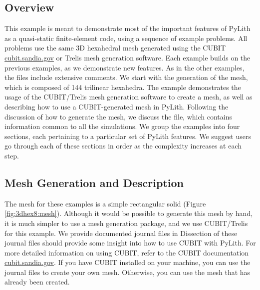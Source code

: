 \subsection{Overview}

This example is meant to demonstrate most of the important features
of PyLith as a quasi-static finite-element code, using a sequence of
example problems. All problems use the same 3D hexahedral mesh
generated using the CUBIT \url{cubit.sandia.gov} or Trelis mesh generation
software. Each example builds on the previous examples, as we
demonstrate new features. As in the other examples, the files include
extensive comments. We start with the generation of the mesh, which is
composed of 144 trilinear hexahedra. The example demonstrates the
usage of the CUBIT/Trelis mesh generation software to create a mesh, as well
as describing how to use a CUBIT-generated mesh in PyLith. Following
the discussion of how to generate the mesh, we discuss the
 file, which contains information common to
all the simulations. We group the examples into four sections, each
pertaining to a particular set of PyLith features. We suggest users go
through each of these sections in order as the complexity increases at
each step.


\subsection{Mesh Generation and Description}

The mesh for these examples is a simple rectangular solid (Figure
\vref{fig:3dhex8:mesh}). Although it would be possible to generate
this mesh by hand, it is much simpler to use a mesh generation
package, and we use CUBIT/Trelis for this example. We provide documented
journal files in  Dissection of these
journal files should provide some insight into how to use CUBIT with
PyLith. For more detailed information on using CUBIT, refer to the
CUBIT documentation \url{cubit.sandia.gov}. If you have CUBIT
installed on your machine, you can use the journal files to create
your own mesh. Otherwise, you can use the mesh that has already been
created.

